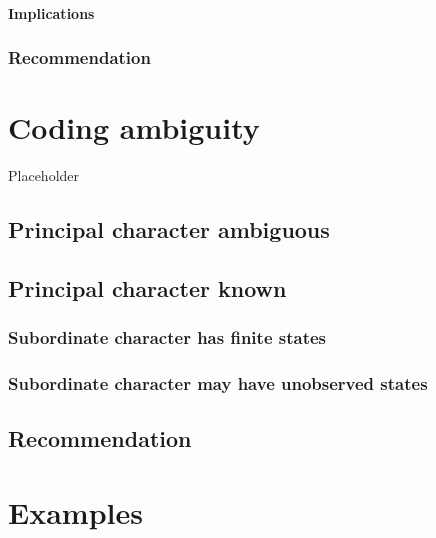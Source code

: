 \documentclass[]{book}
\theoremstyle{definition}
\theoremstyle{definition}
\theoremstyle{definition}
\theoremstyle{remark}
\begin{document}
\hypertarget{implications}{%
\subsubsection{Implications}\label{implications}}

\hypertarget{recommendation}{%
\subsection{Recommendation}\label{recommendation}}

\hypertarget{ambiguity}{%
\chapter{Coding ambiguity}\label{ambiguity}}

Placeholder

\hypertarget{principal-character-ambiguous}{%
\section{Principal character
ambiguous}\label{principal-character-ambiguous}}

\hypertarget{principal-character-known}{%
\section{Principal character known}\label{principal-character-known}}

\hypertarget{subordinate-character-has-finite-states}{%
\subsection{Subordinate character has finite
states}\label{subordinate-character-has-finite-states}}

\hypertarget{subordinate-character-may-have-unobserved-states}{%
\subsection{Subordinate character may have unobserved
states}\label{subordinate-character-may-have-unobserved-states}}

\hypertarget{recommendation-1}{%
\section{Recommendation}\label{recommendation-1}}

\hypertarget{examples}{%
\chapter{Examples}\label{examples}}
\end{document}
